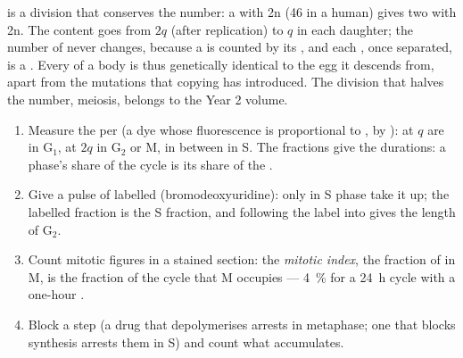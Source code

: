 \begin{proposition}\label{prop:b1:replication-mitosis:conserves}
 is a division that conserves the  number: a 
with 2n  (46 in a human) gives two  with 2n. The 
content goes from $2q$ (after replication) to $q$ in each daughter;
the number of  never changes, because a  is
counted by its , and each , once separated, is a
. Every  of a body is thus genetically identical to the
egg it descends from, apart from the mutations that copying has
introduced. The division that halves the  number, meiosis,
belongs to the Year 2 volume.
\end{proposition}

\begin{method}\label{met:b1:replication-mitosis:reading}
\begin{enumerate}
  \item Measure the  per  (a dye whose fluorescence is
        proportional to ,  by ):  at $q$ are in G$_1$,
        at $2q$ in G$_2$ or M, in between in S. The fractions give the
        durations: a phase's share of the cycle is its share of the
        .
  \item Give a pulse of labelled  (bromodeoxyuridine): only
         in S phase take it up; the labelled fraction is the S
        fraction, and following the label into  gives the length
        of G$_2$.
  \item Count mitotic figures in a stained section: the \emph{mitotic
        index}, the fraction of  in M, is the fraction of the
        cycle that M occupies --- \qty{4}{\%} for a \qty{24}{h} cycle with
        a one-hour .
  \item Block a step (a drug that depolymerises  arrests
         in metaphase; one that blocks  synthesis arrests them
        in S) and count what accumulates.
\end{enumerate}
\end{method}

